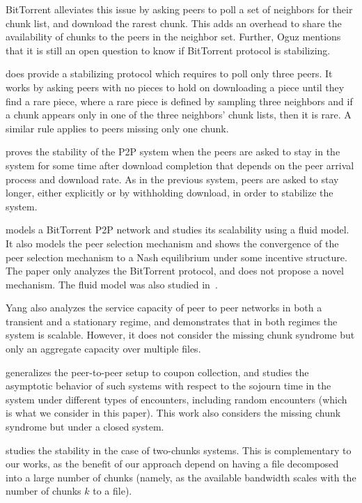 \documentclass[11pt,conference]{IEEEtran}
\begin{document}
BitTorrent alleviates this issue by asking peers to poll a set of neighbors for their chunk list, and download the rarest chunk. This adds an overhead to share the availability of chunks to the peers in the neighbor set. Further, Oguz\cite{Oguz:EECS-2012-6} mentions that it is still an open question to know if BitTorrent protocol is stabilizing.

\cite{Oguz:EECS-2012-6} does provide a stabilizing protocol which requires to poll only three peers. It works by asking peers with no pieces to hold on downloading a piece until they find a rare piece, where a rare piece is defined by sampling three neighbors and if a chunk appears only in one of the three neighbors' chunk lists, then it is rare. A similar rule applies to peers missing only one chunk.

\cite{Zhu2011Stability} proves the stability of the P2P system when the peers are asked to stay in the system for some time after download completion that depends on the peer arrival process and download rate. As in the previous system, peers are asked to stay longer, either explicitly or by withholding download, in order to stabilize the system.

\cite{Qiu2004Modeling} models a BitTorrent P2P network and studies its scalability using a fluid model. It also models the peer selection mechanism and shows the convergence of the peer selection mechanism to a Nash equilibrium under some incentive structure. The paper only analyzes the BitTorrent protocol, and does not propose a novel mechanism. The fluid model was also studied in~\cite{Chow2009}.

Yang\cite{Yang2004Service}\cite{Yang2006} also analyzes the service capacity of peer to peer networks in both a transient and a stationary regime, and demonstrates that in both regimes the system is scalable. However, it does not consider the missing chunk syndrome but only an aggregate capacity over multiple files.

\cite{Massoulie2005Coupon} generalizes the peer-to-peer setup to coupon collection, and studies the asymptotic behavior of such systems with respect to the sojourn time in the system under different types of encounters, including random encounters (which is what we consider in this paper). This work also considers the missing chunk syndrome but under a closed system.

\cite{Norros2011Stability} studies the stability in the case of two-chunks systems. This is complementary to our works, as the benefit of our approach depend on having a file decomposed into a large number of chunks (namely, as the available bandwidth scales with the number of chunks $k$ to a file).
\end{document}
